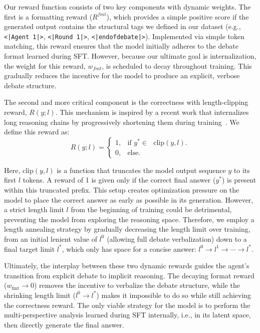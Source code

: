 \documentclass[11pt]{article}
\begin{document}
Our reward function consists of two key components with dynamic weights. The first is a formatting reward ($R^{fmt}$), which provides a simple positive score if the generated output contains the structural tags we defined in our dataset (e.g., \texttt{<|Agent 1|>}, \texttt{<|Round 1|>}, \texttt{<|endofdebate|>}). Implemented via simple token matching, this reward ensures that the model initially adheres to the debate format learned during SFT. However, because our ultimate goal is internalization, the weight for this reward, $w_{fmt}$, is scheduled to decay throughout training. This gradually reduces the incentive for the model to produce an explicit, verbose debate structure. 

The second and more critical component is the correctness with length-clipping reward, $R(y;l)$. This mechanism is inspired by a recent work that internalizes long reasoning chains by progressively shortening them during training~\cite{hou2025thinkprune}. We define this reward as:
\begin{equation}
  R(y;l)=\left\{
    \begin{array}{ll}
      1, & \mbox{if $y^* \in$ $\text{clip}(y,l)$}.\\
      0, & \mbox{else}.
    \end{array}
  \right.
\end{equation}

Here, $\text{clip}(y,l)$ is a function that truncates the model output sequence $y$ to its first $l$ tokens. A reward of 1 is given only if the correct final answer ($y^*$) is present within this truncated prefix. This setup creates optimization pressure on the model to place the correct answer as early as possible in its generation. However, a strict length limit $l$ from the beginning of training could be detrimental, preventing the model from exploring the reasoning space. Therefore, we employ a length annealing strategy by gradually decreasing the length limit over training, from an initial lenient value of $l^0$ (allowing full debate verbalization) down to a final target limit $l^*$, which only has space for a concise answer: $l^0 \rightarrow l^1 \rightarrow \cdots \rightarrow l^*$.

Ultimately, the interplay between these two dynamic rewards guides the agent's transition from explicit debate to implicit reasoning. The decaying format reward ($w_\text{fmt} \rightarrow 0$) removes the incentive to verbalize the debate structure, while the shrinking length limit ($l^0 \rightarrow l^*$) makes it impossible to do so while still achieving the correctness reward. The only viable strategy for the model is to perform the multi-perspective analysis learned during SFT internally, i.e., in its latent space, then directly generate the final answer. 
\end{document}
